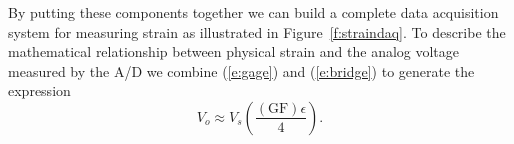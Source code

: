 By putting these components together we can build a complete data acquisition system for measuring strain as illustrated in Figure~\ref{f:straindaq}. To describe the mathematical relationship between physical strain and the analog voltage measured by the A/D we combine (\ref{e:gage}) and (\ref{e:bridge}) to generate the expression
\begin{equation}
V_o \approx V_s\left( \frac{(\mathrm{GF})\epsilon}{4} \right).
\end{equation}

























